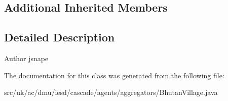 \subsection*{Additional Inherited Members}


\subsection{Detailed Description}
\begin{DoxyAuthor}{Author}
jsnape 
\end{DoxyAuthor}


The documentation for this class was generated from the following file\-:\begin{DoxyCompactItemize}
\item 
src/uk/ac/dmu/iesd/cascade/agents/aggregators/Bhutan\-Village.\-java\end{DoxyCompactItemize}
